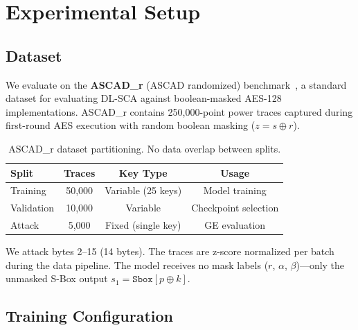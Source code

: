 \documentclass[submission]{iacrtrans}
\newcommand{\Sbox}{\mathtt{Sbox}}
\begin{document}
\section{Experimental Setup}\label{sec:setup}

\subsection{Dataset}

We evaluate on the \textbf{ASCAD\_r} (ASCAD randomized) benchmark~\cite{benadjila2020deep}, a standard dataset for evaluating DL-SCA against boolean-masked AES-128 implementations. ASCAD\_r contains 250,000-point power traces captured during first-round AES execution with random boolean masking ($z = s \oplus r$).

\begin{table}[t]
  \centering
  \caption{ASCAD\_r dataset partitioning. No data overlap between splits.}
  \label{tab:dataset}
  \begin{tabular}{lccc}
    \toprule
    \textbf{Split} & \textbf{Traces} & \textbf{Key Type} & \textbf{Usage} \\
    \midrule
    Training   & 50{,}000  & Variable (25 keys)   & Model training \\
    Validation & 10{,}000  & Variable             & Checkpoint selection \\
    Attack     & 5{,}000   & Fixed (single key)   & GE evaluation \\
    \bottomrule
  \end{tabular}
\end{table}

We attack bytes 2--15 (14 bytes). The traces are z-score normalized per batch during the data pipeline. The model receives no mask labels ($r$, $\alpha$, $\beta$)---only the unmasked S-Box output $s_1 = \Sbox[p \oplus k]$.

\subsection{Training Configuration}
\end{document}
